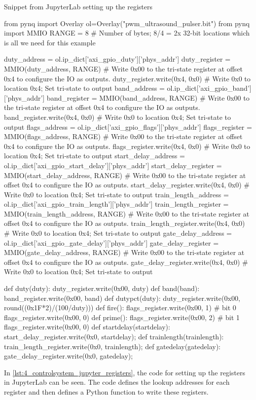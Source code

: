\begin{listing}[htbp]
	\centering
	\caption{Snippet from JupyterLab setting up the registers}
	\label{lst:4_controlsystem_jupyter_registers}
	\begin{mintedpython}
from pynq import Overlay
ol=Overlay("pwm_ultrasound_pulser.bit")
from pynq import MMIO
RANGE = 8 # Number of bytes; 8/4 = 2x 32-bit locations which is all we need for this example

duty_address = ol.ip_dict['axi_gpio_duty']['phys_addr']
duty_register = MMIO(duty_address, RANGE)
# Write 0x00 to the tri-state register at offset 0x4 to configure the IO as outputs.
duty_register.write(0x4, 0x0) # Write 0x0 to location 0x4; Set tri-state to output
band_address = ol.ip_dict['axi_gpio_band']['phys_addr']
band_register = MMIO(band_address, RANGE)
# Write 0x00 to the tri-state register at offset 0x4 to configure the IO as outputs.
band_register.write(0x4, 0x0) # Write 0x0 to location 0x4; Set tri-state to output
flags_address = ol.ip_dict['axi_gpio_flags']['phys_addr']
flags_register = MMIO(flags_address, RANGE)
# Write 0x00 to the tri-state register at offset 0x4 to configure the IO as outputs.
flags_register.write(0x4, 0x0) # Write 0x0 to location 0x4; Set tri-state to output
start_delay_address = ol.ip_dict['axi_gpio_start_delay']['phys_addr']
start_delay_register = MMIO(start_delay_address, RANGE)
# Write 0x00 to the tri-state register at offset 0x4 to configure the IO as outputs.
start_delay_register.write(0x4, 0x0) # Write 0x0 to location 0x4; Set tri-state to output
train_length_address = ol.ip_dict['axi_gpio_train_length']['phys_addr']
train_length_register = MMIO(train_length_address, RANGE)
# Write 0x00 to the tri-state register at offset 0x4 to configure the IO as outputs.
train_length_register.write(0x4, 0x0) # Write 0x0 to location 0x4; Set tri-state to output
gate_delay_address = ol.ip_dict['axi_gpio_gate_delay']['phys_addr']
gate_delay_register = MMIO(gate_delay_address, RANGE)
# Write 0x00 to the tri-state register at offset 0x4 to configure the IO as outputs.
gate_delay_register.write(0x4, 0x0) # Write 0x0 to location 0x4; Set tri-state to output

def duty(duty):
	duty_register.write(0x00, duty)
def band(band):
	band_register.write(0x00, band)
def dutypct(duty):
	duty_register.write(0x00, round((0x1F*2)/(100/duty)))
def fire():
	flags_register.write(0x00, 1) # bit 0
	flags_register.write(0x00, 0)
def prime():
	flags_register.write(0x00, 2) # bit 1
	flags_register.write(0x00, 0)
def startdelay(startdelay):
	start_delay_register.write(0x0, startdelay);
def trainlength(trainlength):
	train_length_register.write(0x0, trainlength);
def gatedelay(gatedelay):
	gate_delay_register.write(0x0, gatedelay);
	\end{mintedpython}
\end{listing}
In \cref{lst:4_controlsystem_jupyter_registers}, the code for setting up the registers in JupyterLab can be seen. The code defines the lookup addresses for each register and then defines a Python function to write these registers.

